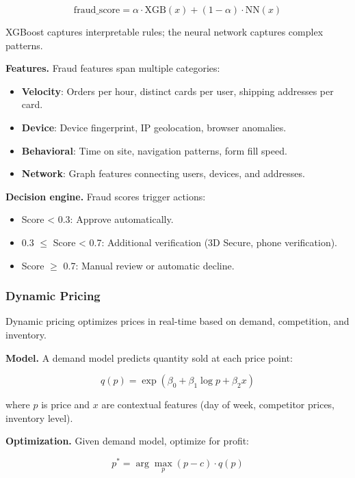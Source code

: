 \begin{equation}
\text{fraud\_score} = \alpha \cdot \text{XGB}(x) + (1-\alpha) \cdot \text{NN}(x)
\end{equation}

XGBoost captures interpretable rules; the neural network captures complex patterns.

\textbf{Features.} Fraud features span multiple categories:
\begin{itemize}
\item \textbf{Velocity}: Orders per hour, distinct cards per user, shipping addresses per card.
\item \textbf{Device}: Device fingerprint, IP geolocation, browser anomalies.
\item \textbf{Behavioral}: Time on site, navigation patterns, form fill speed.
\item \textbf{Network}: Graph features connecting users, devices, and addresses.
\end{itemize}

\textbf{Decision engine.} Fraud scores trigger actions:
\begin{itemize}
\item Score < 0.3: Approve automatically.
\item 0.3 $\leq$ Score < 0.7: Additional verification (3D Secure, phone verification).
\item Score $\geq$ 0.7: Manual review or automatic decline.
\end{itemize}

\subsubsection{Dynamic Pricing}

Dynamic pricing optimizes prices in real-time based on demand, competition, and inventory.

\textbf{Model.} A demand model predicts quantity sold at each price point:

\begin{equation}
q(p) = \exp(\beta_0 + \beta_1 \log p + \beta_2 x)
\end{equation}

where $p$ is price and $x$ are contextual features (day of week, competitor prices, inventory level).

\textbf{Optimization.} Given demand model, optimize for profit:

\begin{equation}
p^* = \arg\max_p (p - c) \cdot q(p)
\end{equation}

